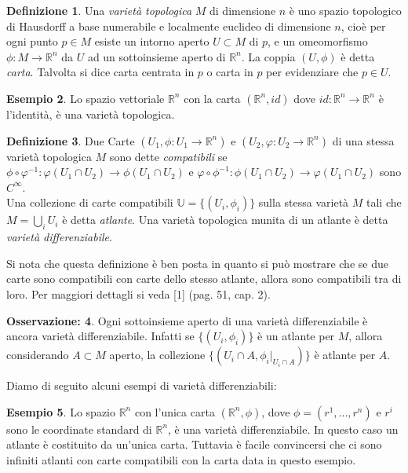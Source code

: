 \documentclass[12pt,a4paper]{report}
\theoremstyle{definition}
\newtheorem{Def}{Definizione}[chapter]
\theoremstyle{definition}
\newtheorem{Ex}[Def]{Esempio}
\theoremstyle{definition}
\theoremstyle{definition}
\newtheorem{Obs}[Def]{Osservazione:}
\begin{document}
\begin{Def}
	Una \textit{varietà topologica} $M$ di dimensione $n$ è uno spazio topologico di Hausdorff a base numerabile e localmente euclideo di dimensione $n$, cioè per ogni punto $p\in M$ esiste un intorno aperto $U\subset M$ di $p$, e un omeomorfismo $\phi:M\rightarrow\mathbb{R}^n$ da $U$ ad un sottoinsieme aperto di $\mathbb{R}^n$. La coppia $(U,\phi)$ è detta \textit{carta}. Talvolta si dice carta centrata in $p$ o carta in $p$ per evidenziare che $p\in U$. 
\end{Def}
\begin{Ex}
	Lo spazio vettoriale $\mathbb{R}^n$ con la carta $(\mathbb{R}^n, id)$ dove $id:\mathbb{R}^n\rightarrow \mathbb{R}^n$ è l'identità, è una varietà topologica. 
\end{Ex}
\begin{Def}
	Due Carte $(U_1,\phi:U_1\rightarrow\mathbb{R}^n)$ e $(U_2,\varphi:U_2\rightarrow\mathbb{R}^n)$ di una stessa varietà topologica $M$ sono dette \textit{compatibili} se
	$\phi\circ\varphi^{-1}:\varphi(U_1\cap U_2)\rightarrow \phi(U_1\cap U_2)$ e $\varphi\circ\phi^{-1}:\phi(U_1\cap U_2)\rightarrow \varphi(U_1\cap U_2)$ sono $C^\infty$.\\
	Una collezione di carte compatibili $\mathbb{U}=\{(U_i,\phi_{i})\}$ sulla stessa varietà $M$ tali che $M=\bigcup_i U_i$ è detta \textit{atlante}. Una varietà topologica munita di un atlante è detta \textit{varietà differenziabile}.
\end{Def}
Si nota che questa definizione è ben posta in quanto si può mostrare che se due carte sono compatibili con carte dello stesso atlante, allora sono compatibili tra di loro. Per maggiori dettagli si veda [1] (pag. 51, cap. 2).
\begin{Obs}\label{Obs:1.1.1}
Ogni sottoinsieme aperto di una varietà differenziabile è ancora varietà differenziabile. Infatti se $\{(U_i,\phi_i)\}$ è un atlante per $M$, allora considerando $A\subset M$ aperto, la collezione $\{(U_i\cap A,\phi_i|_{U_i\cap A})\}$ è atlante per $A$.
\end{Obs}
Diamo di seguito alcuni esempi di varietà differenziabili:
\begin{Ex}
	Lo spazio $\mathbb{R}^n$ con l'unica carta $(\mathbb{R}^n,\phi)$, dove $\phi=(r^1,...,r^n)$ e $r^i$ sono le coordinate standard di $\mathbb{R}^n$, è una varietà differenziabile. In questo caso un atlante è costituito da un'unica carta. Tuttavia è facile convincersi che ci sono infiniti atlanti con carte compatibili con la carta data in questo esempio.
\end{Ex}
\end{document}
